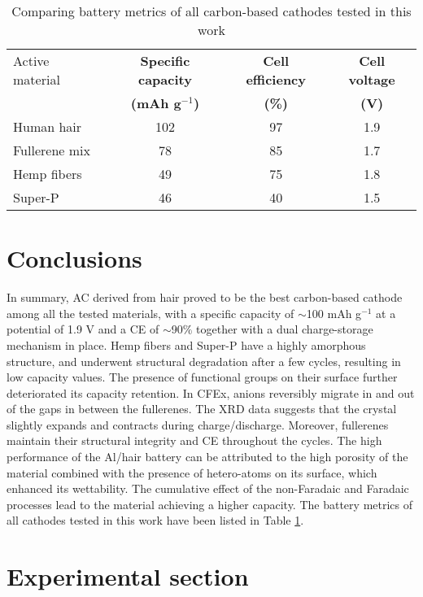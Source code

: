 \documentclass{article}
\begin{document}
\clearpage


\begin{table}
\caption{Comparing battery metrics of all carbon-based cathodes tested in this work} \label{table1}
\begin{center}
\begin{tabular}{|lccc|}
\hline
Active material  & {\textbf{Specific capacity}} & {\textbf{Cell efficiency}} & {\textbf{Cell voltage}}\\
 & {\textbf{(mAh g$^{-1}$)}} & {\textbf{(\%)}} & {\textbf{(V)}}\\
\hline
Human hair &  102 & 97 & 1.9 \\
Fullerene mix &  78 & 85 & 1.7 \\
Hemp fibers & 49 & 75 & 1.8 \\
Super-P & 46 & 40 & 1.5 \\
\hline  
\end{tabular}
\end{center}
\end{table}

\section{Conclusions}
In summary, AC derived from hair proved to be the best carbon-based cathode among all the tested materials, with a specific capacity of $\sim$100 mAh g$^{-1}$ at a potential of 1.9 V and a CE of $\sim$90$\%$ together with a dual charge-storage mechanism in place. Hemp fibers and Super-P have a highly amorphous structure, and underwent structural degradation after a few cycles, resulting in low capacity values. The presence of functional groups on their surface further deteriorated its capacity retention. In CFEx,  anions reversibly migrate in and out of the gaps in between the fullerenes. The XRD data suggests that the crystal slightly expands and contracts  during charge/discharge. Moreover, fullerenes maintain their structural integrity and CE throughout the cycles. The high performance of the Al/hair battery can be attributed to the high porosity of the material combined with the presence of hetero-atoms on its surface, which enhanced its wettability. The cumulative effect of the non-Faradaic and Faradaic processes lead to the material achieving a higher capacity. The battery metrics of all cathodes tested in this work have been listed in Table \ref{table1}.


\section{Experimental section}
\end{document}
